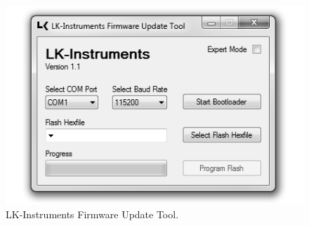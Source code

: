 \begin{figure}[h]
  \centering
  \includegraphics[resolution=96]{./grafiken/update_tool_sw.png}
  \caption[Firmware Update Tool]{LK-Instruments Firmware Update Tool.}
  \label{pic_update_tool}
\end{figure}

